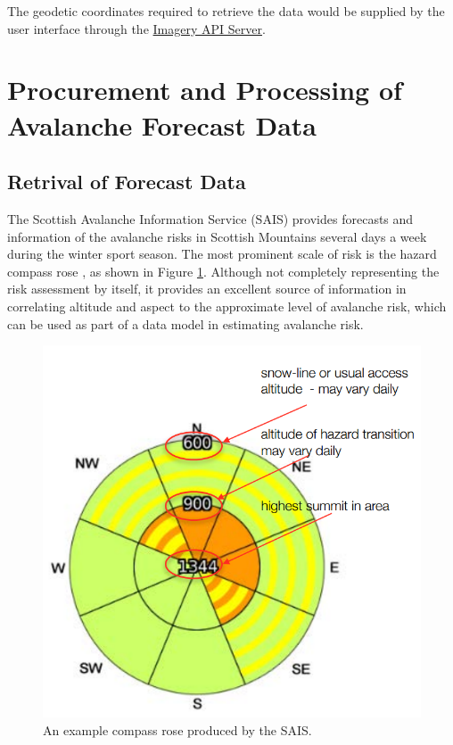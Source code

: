 \documentclass[11pt, oneside]{article}
\begin{document}
		The geodetic coordinates required to retrieve the data would be supplied by the user interface through the \hyperref[sec:APIServer]{Imagery API Server}.
		
		
\section{Procurement and Processing of Avalanche Forecast Data}
	\subsection{Retrival of Forecast Data}
		The Scottish Avalanche Information Service (SAIS)\cite{sais} provides forecasts and information of the avalanche risks in Scottish Mountains several days a week during the winter sport season. The most prominent scale of risk is the hazard compass rose \cite[p. 4]{sais-report}, as shown in Figure \ref{fig:comassrose}. Although not completely representing the risk assessment by itself, it provides an excellent source of information in correlating altitude and aspect to the approximate level of avalanche risk, which can be used as part of a data model in estimating avalanche risk.
		\begin{figure}[h]
		\label{fig:comassrose}
		\centering
		\includegraphics[scale=0.3]{CompassRose.png}
		\caption{An example compass rose produced by the SAIS.\cite[p. 4]{sais-report}}
		\end{figure}
		
\end{document}
